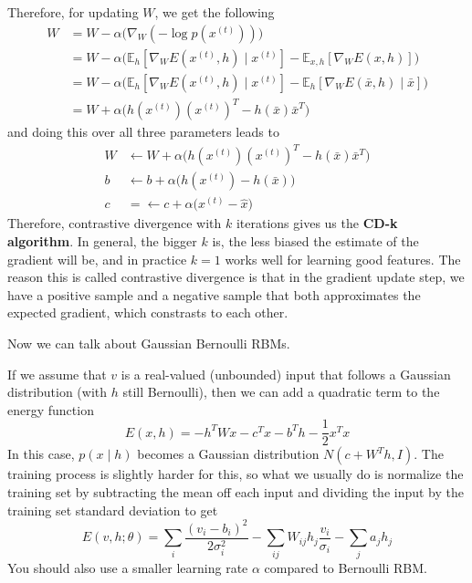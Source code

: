   Therefore, for updating $W$, we get the following 
  \begin{align} 
    W & = W - \alpha \big( \nabla_{W}(- \log p(x^{(t)})) \big) \\
               & = W - \alpha \big( \mathbb{E}_{h} [ \nabla_{W} E(x^{(t)}, h) \mid x^{(t)} ] - \mathbb{E}_{x, h} [\nabla_{W} E(x, h) ]\big) \\
               & = W - \alpha \big( \mathbb{E}_{h} [ \nabla_{W} E(x^{(t)}, h) \mid x^{(t)} ] - \mathbb{E}_{h} [\nabla_{W} E(\bar{x}, h) \mid \bar{x} ]\big) \\
               & = W + \alpha \big( h(x^{(t)}) (x^{(t)})^T               - h(\bar{x}) \bar{x}^T \big)
  \end{align}
  and doing this over all three parameters leads to 
  \begin{align} 
    W & \leftarrow W + \alpha \big( h (x^{(t)}) (x^{(t)})^T - h(\bar{x}) \bar{x}^T \big) \\
    b & \leftarrow b + \alpha \big( h(x^{(t)}) - h(\bar{x}) \big) \\
    c & = \leftarrow c + \alpha \big( x^{(t)} - \hat{x} \big) 
  \end{align}
  Therefore, contrastive divergence with $k$ iterations gives us the \textbf{CD-k algorithm}. In general, the bigger $k$ is, the less biased the estimate of the gradient will be, and in practice $k=1$ works well for learning good features. The reason this is called contrastive divergence is that in the gradient update step, we have a positive sample and a negative sample that both approximates the expected gradient, which constrasts to each other. 

  Now we can talk about Gaussian Bernoulli RBMs. 

  \begin{definition} 
    If we assume that $v$ is a real-valued (unbounded) input that follows a Gaussian distribution (with $h$ still Bernoulli), then we can add a quadratic term to the energy function 
    \begin{equation} 
      E(x, h) = - h^T W x - c^T x - b^T h - \frac{1}{2} x^T x
    \end{equation}
    In this case, $p(x \mid h)$ becomes a Gaussian distribution $N(c + W^T h, I)$. The training process is slightly harder for this, so what we usually do is normalize the training set by subtracting the mean off each input and dividing the input by the training set standard deviation to get  
    \begin{equation} 
      E(v, h; \theta) = \sum_i \frac{(v_i - b_i)^2}{2 \sigma_i^2} - \sum_{ij} W_{ij} h_j \frac{v_i}{\sigma_i} - \sum_j a_j h_j
    \end{equation}
    You should also use a smaller learning rate $\alpha$ compared to Bernoulli RBM. 
  \end{definition} 

